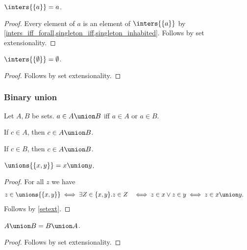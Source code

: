 \begin{proposition}\label{inters_singleton}
    $\inters{\{a\}} = a$.
\end{proposition}
\begin{proof}
    Every element of $a$ is an element of $\inters{\{a\}}$
        by \cref{inters_iff_forall,singleton_iff,singleton_inhabited}.
    Follows by set extensionality.
\end{proof}

\begin{proposition}\label{inters_emptyset}
    $\inters{\{\emptyset\}} = \emptyset$.
\end{proposition}
\begin{proof}
    Follows by set extensionality.
\end{proof}

\subsubsection{Binary union}

\begin{axiom}\label{union_iff}
    Let $A, B$ be sets.
    $a\in A\union B$ iff $a\in A$ or $a\in B$.
\end{axiom}

\begin{proposition}\label{union_intro_left}
    If $c\in A$, then $c\in A\union B$.
\end{proposition}

\begin{proposition}\label{union_intro_right}
    If $c\in B$, then $c\in A\union B$.
\end{proposition}

\begin{proposition}\label{union_as_unions}
    $\unions{\{x,y\}} = x\union y$.
\end{proposition}
\begin{proof}
    For all $z$ we have
    \begin{align*}
        z\in \unions{\{x,y\}}
        &\iff \exists Z\in\{x,y\}. z\in Z
        &\iff z\in x \lor z\in y
        &\iff z\in x\union y.
    \end{align*}
    Follows by \cref{setext}.
\end{proof}

\begin{proposition}%
\label{union_comm}
    $A\union B = B\union A$.
\end{proposition}
\begin{proof}
    Follows by set extensionality.
\end{proof}

